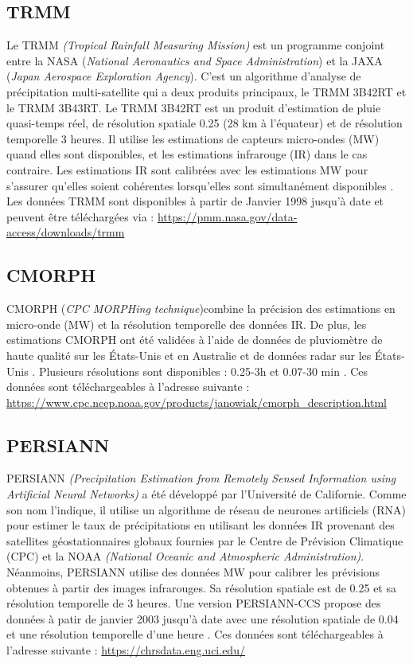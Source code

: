 \subsection{TRMM}
\begin{sloppypar}
Le TRMM \emph{(Tropical Rainfall Measuring Mission)} est un programme conjoint entre la NASA (\emph{National Aeronautics and Space Administration}) et la JAXA (\emph{Japan Aerospace Exploration Agency}). C'est un algorithme d'analyse de précipitation multi-satellite qui a deux produits principaux, le TRMM 3B42RT et le TRMM 3B43RT. Le TRMM 3B42RT est un produit d'estimation de pluie quasi-temps réel, de résolution spatiale 0.25 (28 km à l'équateur) et de résolution temporelle 3 heures. Il utilise les estimations de capteurs micro-ondes (MW) quand elles sont disponibles, et les estimations infrarouge (IR) dans le cas contraire. Les estimations IR sont calibrées avec les estimations MW pour s'assurer qu'elles soient cohérentes lorsqu'elles sont simultanément disponibles \cite{brochart_correction_2014}. Les données TRMM sont disponibles \`a partir de Janvier 1998 jusqu'à date et peuvent être téléchargées via : \url{https://pmm.nasa.gov/data-access/downloads/trmm} 
\end{sloppypar}
\subsection{CMORPH}
CMORPH (\emph{CPC MORPHing technique})combine la précision des estimations en micro-onde (MW) et la résolution temporelle  des données IR. De plus, les estimations CMORPH ont été validées à l'aide de données de pluviomètre de haute qualité sur les États-Unis et en Australie et de données radar sur les États-Unis \cite{brochart_correction_2014}. Plusieurs résolutions sont disponibles : 0.25-3h et 0.07-30 min \cite{joyce_cmorph:_2004}. Ces données sont téléchargeables à l'adresse suivante : \url{https://www.cpc.ncep.noaa.gov/products/janowiak/cmorph_description.html} 
\subsection{PERSIANN}
PERSIANN \emph{(Precipitation Estimation from Remotely Sensed Information using Artificial Neural Networks)} a été développé par l'Université de Californie. Comme son nom l'indique, il utilise un algorithme de réseau de neurones artificiels (RNA) pour estimer le taux de précipitations en utilisant les données  IR provenant des satellites géostationnaires globaux fournies par le Centre de Prévision Climatique (CPC) et la NOAA \emph{(National Oceanic and Atmospheric Administration)}\cite{alijanian_evaluation_2017}. Néanmoins, PERSIANN utilise des données MW pour calibrer les prévisions obtenues \`a partir des images infrarouges. Sa résolution spatiale est de 0.25 et sa résolution temporelle de 3 heures. Une
version PERSIANN-CCS propose des donn\'ees \`a patir de janvier 2003 jusqu'\`a date avec une résolution spatiale de 0.04 et une r\'esolution temporelle d'une heure \cite{brochart_correction_2014}.
 Ces données sont téléchargeables à l'adresse suivante : \url{https://chrsdata.eng.uci.edu/} 
